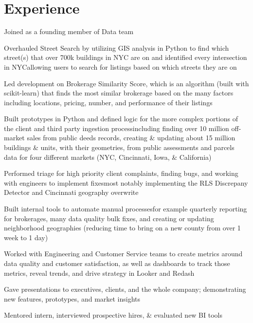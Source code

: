 \documentclass[a4paper]{deedy-resume-openfont} %
\begin{document}
\begin{minipage}[t]{0.66\textwidth} %


\section{Experience}
\vspace{\topsep} %
\begin{tightitemize}
	\item Joined as a founding member of Data team
    \item Overhauled Street Search by utilizing GIS analysis in Python to find which street(s) that over 700k buildings in NYC are on and identified every intersection in NYC\textemdash allowing users to search for listings based on which streets they are on
    \item Led development on Brokerage Similarity Score, which is an algorithm (built with scikit-learn) that finds the most similar brokerage based on the many factors including locations, pricing, number, and performance of their listings
    \item Built prototypes in Python and defined logic for the more complex portions of the client and third party ingestion process\textemdash including finding over 10 million off-market sales from public deeds records, creating \& updating about 15 million buildings \& units, with their geometries, from public assessments and parcels data for four different markets (NYC, Cincinnati, Iowa, \& California)
    \item Performed triage for high priority client complaints, finding bugs, and working with engineers to implement fixes\textemdash most notably implementing the RLS Discrepany Detector and Cincinnati geography overwrite
    \item Built internal tools to automate manual processes\textemdash for example quarterly reporting for brokerages, many data quality bulk fixes, and creating or updating neighborhood geographies (reducing time to bring on a new county from over 1 week to 1 day)
    \item Worked with Engineering and Customer Service teams to create metrics around data quality and customer satisfaction, as well as dashboards to track those metrics, reveal trends, and drive strategy in Looker and Redash
    \item Gave presentations to executives, clients, and the whole company; demonstrating new features, prototypes, and market insights
    \item Mentored intern, interviewed prospective hires, \& evaluated new BI tools
\end{tightitemize}


\end{minipage}
\end{document}
